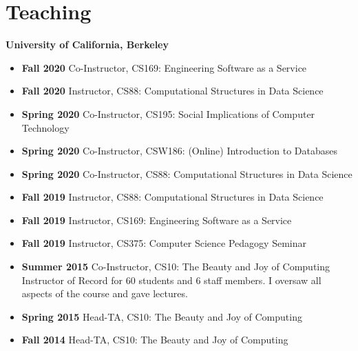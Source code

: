 \section{Teaching}

\vspace{6pt}

\textbf{University of California, Berkeley}

\vspace{5pt}

\begin{itemize}

  \setlength\itemsep{1em}
    \item \textbf{Fall 2020} Co-Instructor, CS169: Engineering Software as a Service

    \item \textbf{Fall 2020} Instructor, CS88: Computational Structures in Data Science
    
    \item \textbf{Spring 2020} Co-Instructor, CS195: Social Implications of Computer Technology
      
    \item \textbf{Spring 2020} Co-Instructor, CSW186: (Online) Introduction to Databases
    
    \item \textbf{Spring 2020} Co-Instructor, CS88: Computational Structures in Data Science

    \item \textbf{Fall 2019} Instructor, CS88: Computational Structures in Data Science
    
    \item \textbf{Fall 2019} Instructor, CS169: Engineering Software as a Service
    
    \item \textbf{Fall 2019} Instructor, CS375: Computer Science Pedagogy Seminar 
    
    \item \textbf{Summer 2015} Co-Instructor, CS10: The Beauty and Joy of Computing
    \newline
    \small Instructor of Record for 60 students and 6 staff members. I oversaw all aspects of the course and gave lectures.

    \item \textbf{Spring 2015} Head-TA, CS10: The Beauty and Joy of Computing
    
    \item \textbf{Fall 2014} Head-TA, CS10: The Beauty and Joy of Computing
    

\end{itemize}
